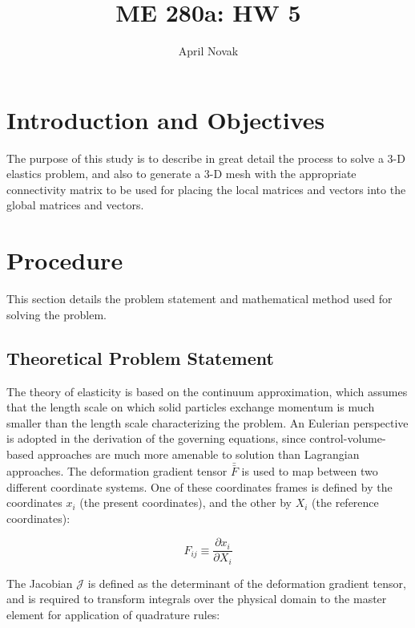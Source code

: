 \documentclass[10pt]{article}
\begin{document}
\title{ME 280a: HW 5}
\author{April Novak}

\maketitle

\section{Introduction and Objectives}

The purpose of this study is to describe in great detail the process to solve a 3-D elastics problem, and also to generate a 3-D mesh with the appropriate connectivity matrix to be used for placing the local matrices and vectors into the global matrices and vectors.

\section{Procedure}
\label{sec:Procedure}

This section details the problem statement and mathematical method used for solving the problem.

\subsection{Theoretical Problem Statement}

The theory of elasticity is based on the continuum approximation, which assumes that the length scale on which solid particles exchange momentum is much smaller than the length scale characterizing the problem. An Eulerian perspective is adopted in the derivation of the governing equations, since control-volume-based approaches are much more amenable to solution than Lagrangian approaches. The deformation gradient tensor \(\bar{\bar{F}}\) is used to map between two different coordinate systems. One of these coordinates frames is defined by the coordinates \(x_i\) (the present coordinates), and the other by \(X_i\) (the reference coordinates):

\begin{equation}
\label{eq:DeformationGradient}
F_{ij}\equiv\frac{\partial x_i}{\partial X_i}
\end{equation}

The Jacobian \(\mathscr{J}\) is defined as the determinant of the deformation gradient tensor, and is required to transform integrals over the physical domain to the master element for application of quadrature rules:
\end{document}
